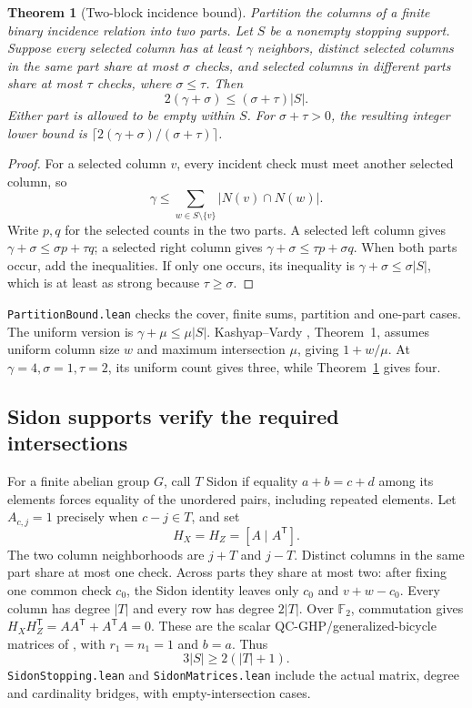 \documentclass[11pt]{article}
\newtheorem{theorem}{Theorem}
\begin{document}
\begin{theorem}[Two-block incidence bound]\label{thm:partition}
Partition the columns of a finite binary incidence relation into two parts.
Let $S$ be a nonempty stopping support. Suppose every selected column has at
least $\gamma$ neighbors, distinct selected columns in the same part share at
most $\sigma$ checks, and selected columns in different parts share at most
$\tau$ checks, where $\sigma\le\tau$. Then
\[
 2(\gamma+\sigma)\le(\sigma+\tau)|S|.
\]
Either part is allowed to be empty within $S$. For $\sigma+\tau>0$, the
resulting integer lower bound is $\lceil2(\gamma+\sigma)/(\sigma+\tau)\rceil$.
\end{theorem}
\begin{proof}
For a selected column $v$, every incident check must meet another selected
column, so
\[
 \gamma\le\sum_{w\in S\setminus\{v\}}|N(v)\cap N(w)|.
\]
Write $p,q$ for the selected counts in the two parts. A selected left column
gives $\gamma+\sigma\le\sigma p+\tau q$; a selected right column gives
$\gamma+\sigma\le\tau p+\sigma q$. When both parts occur, add the inequalities.
If only one occurs, its inequality is $\gamma+\sigma\le\sigma|S|$,
which is at least as strong because $\tau\ge\sigma$.
\end{proof}
\texttt{PartitionBound.lean} checks the cover, finite sums, partition and
one-part cases. The uniform version is $\gamma+\mu\le\mu|S|$.
Kashyap--Vardy \cite{ref2}, Theorem~1, assumes uniform column size $w$ and maximum
intersection $\mu$, giving $1+w/\mu$. At $\gamma=4,\sigma=1,\tau=2$,
its uniform count gives three, while Theorem~\ref{thm:partition} gives four.

\subsection{Sidon supports verify the required intersections}
For a finite abelian group $G$, call $T$ Sidon if equality $a+b=c+d$ among its
elements forces equality of the unordered pairs, including repeated elements.
Let $A_{c,j}=1$ precisely when $c-j\in T$, and set
\[
 H_X=H_Z=[A\mid A^{\mathsf T}].
\]
The two column neighborhoods are $j+T$ and $j-T$. Distinct columns in the same
part share at most one check. Across parts they share at most two: after fixing
one common check $c_0$, the Sidon identity leaves only $c_0$ and $v+w-c_0$.
Every column has degree $|T|$ and every row has degree $2|T|$.
Over $\mathbb F_2$, commutation gives
$H_XH_Z^{\mathsf T}=AA^{\mathsf T}+A^{\mathsf T}A=0$.
These are the scalar QC-GHP/generalized-bicycle matrices of \cite{ref1,ref4}, with
$r_1=n_1=1$ and $b=a$. Thus
\[
 3|S|\ge2(|T|+1).
\]
\texttt{SidonStopping.lean} and \texttt{SidonMatrices.lean} include the actual
matrix, degree and cardinality bridges, with empty-intersection cases.
\end{document}
